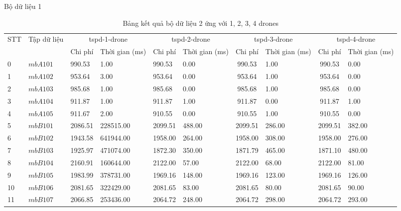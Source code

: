 \documentclass[compress]{beamer}
\begin{document}
\begin{frame}{Bộ dữ liệu 1}
\tiny
\begin{longtable}{|p{0.2cm}|p{1.0cm}|p{0.55cm}|p{0.85cm}|p{0.6cm}|p{0.7cm}|c|p{0.85cm}|c|p{0.85cm}|}
\caption{Bảng kết quả bộ dữ liệu 2 ứng với 1, 2, 3, 4 drones}
\label{tabletspkd1}\\ 
\toprule
STT&\multirow{2}{*}{Tập dữ liệu} & \multicolumn{2}{c|}{tspd-1-drone } &\multicolumn{2}{c|}{tspd-2-drone } &\multicolumn{2}{c|}{tspd-3-drone }&\multicolumn{2}{c|}{tspd-4-drone } \\
\cline{3-10} 
&&Chi phí &Thời gian (ms)&Chi phí &Thời gian (ms)&Chi phí &Thời gian (ms)&Chi phí &Thời gian (ms)\\
\midrule
        \toprule
0&$mbA101$ &     990.53 &      1.00 &     990.53 &       0.00 &     990.53 &       1.00 &     990.53 &       0.00\\ \hline 
1&$mbA102$ &     953.64 &      3.00 &     953.64 &       0.00 &     953.64 &       1.00 &     953.64 &       0.00\\ \hline 
2&$mbA103$ &     985.68 &      1.00 &     985.68 &       0.00 &     985.68 &       1.00 &     985.68 &       0.00\\ \hline 
3&$mbA104$ &     911.87 &      1.00 &     911.87 &       1.00 &     911.87 &       0.00 &     911.87 &       1.00\\ \hline 
4&$mbA105$ &     911.67 &      2.00 &     910.55 &       0.00 &     910.55 &       1.00 &     910.55 &       0.00\\ \hline 
5&$mbB101$ &    2086.51 & 228515.00 &    2099.51 &     488.00 &    2099.51 &     286.00 &    2099.51 &     382.00\\ \hline 
6&$mbB102$ &    1943.58 & 641944.00 &    1958.00 &     264.00 &    1958.00 &     308.00 &    1958.00 &     276.00\\ \hline 
7&$mbB103$ &    1925.97 & 471074.00 &    1872.30 &     350.00 &    1871.79 &     465.00 &    1871.10 &     480.00\\ \hline 
8&$mbB104$ &    2160.91 & 160644.00 &    2122.00 &      57.00 &    2122.00 &      68.00 &    2122.00 &      81.00\\ \hline 
9&$mbB105$ &    1983.99 & 378731.00 &    1969.16 &     148.00 &    1969.16 &     123.00 &    1969.16 &     126.00\\ \hline 
10&$mbB106$ &    2081.65 & 322429.00 &    2081.65 &      83.00 &    2081.65 &      80.00 &    2081.65 &      90.00\\ \hline 
11&$mbB107$ &    2066.85 & 253436.00 &    2064.72 &     248.00 &    2064.72 &     298.00 &    2064.72 &     293.00\\ \hline 

\end{longtable}
\end{frame}
\end{document}
